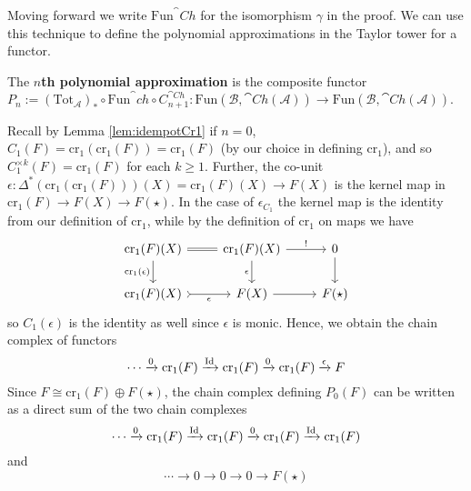 Moving forward we write $\text{Fun}^\cat{Ch}$ for the isomorphism $\gamma$ in the proof. We can use this technique to define the polynomial approximations in the Taylor tower for a functor.

\begin{defn}[label=defn:4.2]{}
    The \textbf{$n$th polynomial approximation} is the composite functor $P_n := (\text{Tot}_\mathcal{A})_*\circ \text{Fun}^\cat{ch}\circ C_{n+1}^{\cat{Ch}}:\text{Fun}(\mathcal{B},\cat{Ch}(\mathcal{A}))\rightarrow \text{Fun}(\mathcal{B},\cat{Ch}(\mathcal{A}))$. 
\end{defn}


Recall by Lemma \ref{lem:idempotCr1} if $n = 0$, $C_1(F) = \text{cr}_1(\text{cr}_1(F))=\text{cr}_1(F)$ (by our choice in defining $\text{cr}_1$), and so $C_1^{\times k}(F) = \text{cr}_1(F)$ for each $k \geq 1$. Further, the co-unit $\epsilon:\Delta^*(\text{cr}_1(\text{cr}_1(F)))(X) = \text{cr}_1(F)(X)\rightarrow F(X)$ is the kernel map in $\text{cr}_1(F)\rightarrow F(X)\rightarrow F(\star)$. In the case of $\epsilon_{C_1}$ the kernel map is the identity from our definition of $\text{cr}_1$, while by the definition of $\text{cr}_1$ on maps we have
\[\begin{tikzcd}
	{\text{cr}_1(F)(X)} & {\text{cr}_1(F)(X)} & 0 \\
	{\text{cr}_1(F)(X)} & {F(X)} & {F(\star)}
	\arrow[Rightarrow, no head, from=1-1, to=1-2]
	\arrow["{!}", from=1-2, to=1-3]
	\arrow["{\text{cr}_1(\epsilon)}"', from=1-1, to=2-1]
	\arrow["\epsilon"', from=1-2, to=2-2]
	\arrow[from=2-2, to=2-3]
	\arrow[from=1-3, to=2-3]
	\arrow["\epsilon"', tail, from=2-1, to=2-2]
\end{tikzcd}\]
so $C_1(\epsilon)$ is the identity as well since $\epsilon$ is monic. Hence, we obtain the chain complex of functors
\begin{equation*}
    \cdots \xrightarrow{0}\text{cr}_1(F)\xrightarrow{\operatorname{Id}}\text{cr}_1(F)\xrightarrow{0}\text{cr}_1(F)\xrightarrow{\epsilon}F
\end{equation*}
Since $F \cong \text{cr}_1(F)\oplus F(\star)$, the chain complex defining $P_0(F)$ can be written as a direct sum of the two chain complexes
\begin{equation*}
    \cdots \xrightarrow{0}\text{cr}_1(F)\xrightarrow{\operatorname{Id}}\text{cr}_1(F)\xrightarrow{0}\text{cr}_1(F)\xrightarrow{\operatorname{Id}}\text{cr}_1(F)
\end{equation*}
and
\begin{equation*}
    \cdots\rightarrow 0\rightarrow 0 \rightarrow 0 \rightarrow F(\star)
\end{equation*}
